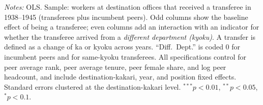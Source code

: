 \begin{table}[htbp]
\begin{threeparttable}
\begin{tablenotes}[flushleft]
\item \textit{Notes:} OLS. Sample: workers at destination offices that received a transferee in 1938--1945 (transferees plus incumbent peers). Odd columns show the baseline effect of being a transferee; even columns add an interaction with an indicator for whether the transferee arrived from a \emph{different department (kyoku)}. A transfer is defined as a change of ka or kyoku across years. ``Diff.\ Dept.'' is coded 0 for incumbent peers and for same-kyoku transferees. All specifications control for peer average rank, peer average tenure, peer female share, and log peer headcount, and include destination-kakari, year, and position fixed effects. Standard errors clustered at the destination-kakari level. $^{***}p<0.01$, $^{**}p<0.05$, $^{*}p<0.1$.
\end{tablenotes}\end{threeparttable}\end{table}
